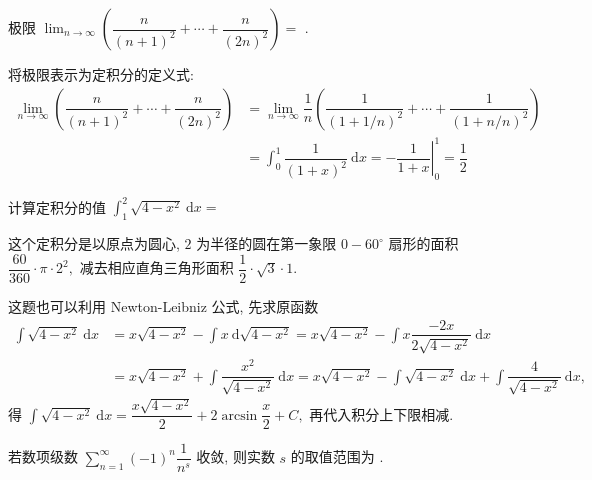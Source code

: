 

\begin{question}
极限 $\displaystyle \lim_{n\to\infty} \left( \dfrac{n}{(n+1)^2} + \cdots + \dfrac{n}{(2n)^2} \right) =$ \fillin[$1/2$].
\end{question}

\begin{solution}
将极限表示为定积分的定义式:
\begin{equation*}
\begin{aligned}
\lim_{n\to\infty} \left( \dfrac{n}{(n+1)^2} + \cdots + \dfrac{n}{(2n)^2} \right) & = \lim_{n\to\infty} \dfrac{1}{n}\left( \dfrac{1}{(1+1/n)^2} + \cdots + \dfrac{1}{(1+n/n)^2} \right) \\
& = \int_0^1 \dfrac{1}{(1 + x)^2} ~ \mathrm{d}x = \left. -\dfrac{1}{1+x} \right|_0^1 = \dfrac{1}{2}
\end{aligned}
\end{equation*}
\end{solution}

\begin{question}
计算定积分的值 $\int_{1}^{2} \sqrt{4 - x^2} ~ \mathrm{d} x = $ 
\end{question}

\begin{solution}
这个定积分是以原点为圆心, $2$ 为半径的圆在第一象限 $0 - 60^\circ$ 扇形的面积 $\dfrac{60}{360} \cdot \pi \cdot 2^2,$ 减去相应直角三角形面积 $\dfrac{1}{2} \cdot \sqrt{3} \cdot 1.$

这题也可以利用 Newton-Leibniz 公式, 先求原函数
\begin{align*}
\int \sqrt{4 - x^2} ~ \mathrm{d} x & = x \sqrt{4 - x^2} - \int x ~ \mathrm{d} \sqrt{4 - x^2} = x \sqrt{4 - x^2} - \int x \dfrac{-2x}{2\sqrt{4 - x^2}} ~ \mathrm{d} x \\
& = x \sqrt{4 - x^2} + \int \dfrac{x^2}{\sqrt{4 - x^2}} ~ \mathrm{d} x = x \sqrt{4 - x^2} - \int \sqrt{4 - x^2} ~ \mathrm{d} x + \int  \dfrac{4}{\sqrt{4 - x^2}} ~ \mathrm{d} x,
\end{align*}
得 $\int \sqrt{4 - x^2} ~ \mathrm{d} x = \dfrac{x \sqrt{4 - x^2}}{2} + 2 \arcsin \dfrac{x}{2} + C,$ 再代入积分上下限相减.
\end{solution}

\begin{question}
若数项级数 $\displaystyle \sum_{n=1}^{\infty} (-1)^n\dfrac{1}{n^s}$ 收敛, 则实数 $s$ 的取值范围为 \fillin[$s > 0$].
\end{question}

